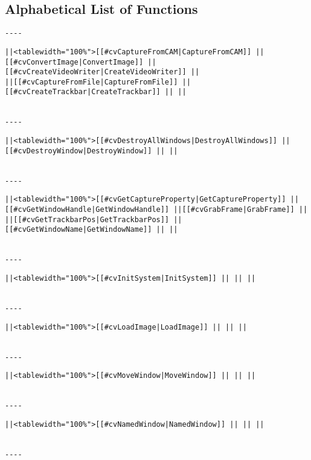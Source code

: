 \subsection{Alphabetical List of Functions}
\begin{verbatim}
----

\end{verbatim}
\begin{verbatim}
||<tablewidth="100%">[[#cvCaptureFromCAM|CaptureFromCAM]] ||[[#cvConvertImage|ConvertImage]] ||[[#cvCreateVideoWriter|CreateVideoWriter]] ||
||[[#cvCaptureFromFile|CaptureFromFile]] ||[[#cvCreateTrackbar|CreateTrackbar]] || ||


----

\end{verbatim}
\begin{verbatim}
||<tablewidth="100%">[[#cvDestroyAllWindows|DestroyAllWindows]] ||[[#cvDestroyWindow|DestroyWindow]] || ||


----

\end{verbatim}
\begin{verbatim}
||<tablewidth="100%">[[#cvGetCaptureProperty|GetCaptureProperty]] ||[[#cvGetWindowHandle|GetWindowHandle]] ||[[#cvGrabFrame|GrabFrame]] ||
||[[#cvGetTrackbarPos|GetTrackbarPos]] ||[[#cvGetWindowName|GetWindowName]] || ||


----

\end{verbatim}
\begin{verbatim}
||<tablewidth="100%">[[#cvInitSystem|InitSystem]] || || ||


----

\end{verbatim}
\begin{verbatim}
||<tablewidth="100%">[[#cvLoadImage|LoadImage]] || || ||


----

\end{verbatim}
\begin{verbatim}
||<tablewidth="100%">[[#cvMoveWindow|MoveWindow]] || || ||


----

\end{verbatim}
\begin{verbatim}
||<tablewidth="100%">[[#cvNamedWindow|NamedWindow]] || || ||


----

\end{verbatim}
